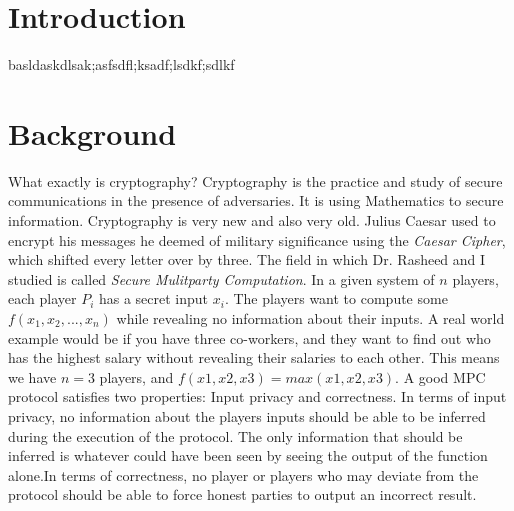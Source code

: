 \documentclass[12pt]{article}
\begin{document}
\newpage

\section{Introduction}
basldaskdlsak;asfsdfl;ksadf;lsdkf;sdlkf

\section{Background}
What exactly is cryptography? Cryptography is the practice and study of secure communications in the presence of adversaries. It is using Mathematics to secure information. Cryptography is very new and also very old. Julius Caesar used to encrypt his messages he deemed of military significance using the \textit{Caesar Cipher}, which shifted every letter over by three. The field in which Dr. Rasheed and I studied is called \textit{Secure Mulitparty Computation}. In a given system of $n$ players, each player $P_i$ has a secret input $x_i$. The players want to compute some $f(x_1,x_2,...,x_n)$ while revealing no information about their inputs. A real world example would be if you have three co-workers, and they want to find out who has the highest salary without revealing their salaries to each other. This means we have $n=3$ players, and $f(x1,x2,x3) = max(x1,x2,x3)$. A good MPC protocol satisfies two properties: Input privacy and correctness. In terms of input privacy, no information about the players inputs should be able to be inferred during the execution of the protocol. The only information that should be inferred is whatever could have been seen by seeing the output of the function alone.In terms of correctness, no player or players who may deviate from the protocol should be able to force honest parties to output an incorrect result.  
\end{document}
